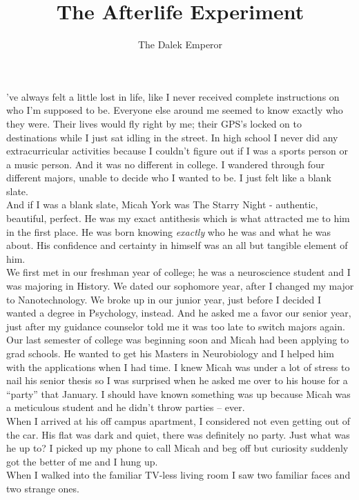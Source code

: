 \documentclass[a5paper]{scrartcl}
\title{The Afterlife Experiment}
\author{The Dalek Emperor}
\begin{document}
\maketitle

've always felt a little lost in life, like I never received complete instructions on who I'm supposed to be. Everyone else around me seemed to know exactly who they were. Their lives would fly right by me; their GPS's locked on to destinations while I just sat idling in the street. In high school I never did any extracurricular activities because I couldn't figure out if I was a sports person or a music person. And it was no different in college. I wandered through four different majors, unable to decide who I wanted to be. I just felt like a blank slate.\\
And if I was a blank slate, Micah York was The Starry Night - authentic, beautiful, perfect. He was my exact antithesis which is what attracted me to him in the first place. He was born knowing \textit{exactly} who he was and what he was about. His confidence and certainty in himself was an all but tangible element of him.\\
We first met in our freshman year of college; he was a neuroscience student and I was majoring in History. We dated our sophomore year, after I changed my major to Nanotechnology. We broke up in our junior year, just before I decided I wanted a degree in Psychology, instead. And he asked me a favor our senior year, just after my guidance counselor told me it was too late to switch majors again.\\
Our last semester of college was beginning soon and Micah had been applying to grad schools. He wanted to get his Masters in Neurobiology and I helped him with the applications when I had time. I knew Micah was under a lot of stress to nail his senior thesis so I was surprised when he asked me over to his house for a “party” that January. I should have known something was up because Micah was a meticulous student and he didn't throw parties – ever.\\
When I arrived at his off campus apartment, I considered not even getting out of the car. His flat was dark and quiet, there was definitely no party. Just what was he up to? I picked up my phone to call Micah and beg off but curiosity suddenly got the better of me and I hung up.\\
When I walked into the familiar TV-less living room I saw two familiar faces and two strange ones.\\
\end{document}
